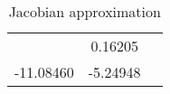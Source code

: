 
    \begin{table}\caption{Jacobian approximation}
\centering
    \begin{tabular}{|l|c|c|}
    \toprule
    \miderule146 & 0.16205\\
-11.08460 & -5.24948\\

      \bottomrule
      \end{tabular}
      \end{table}